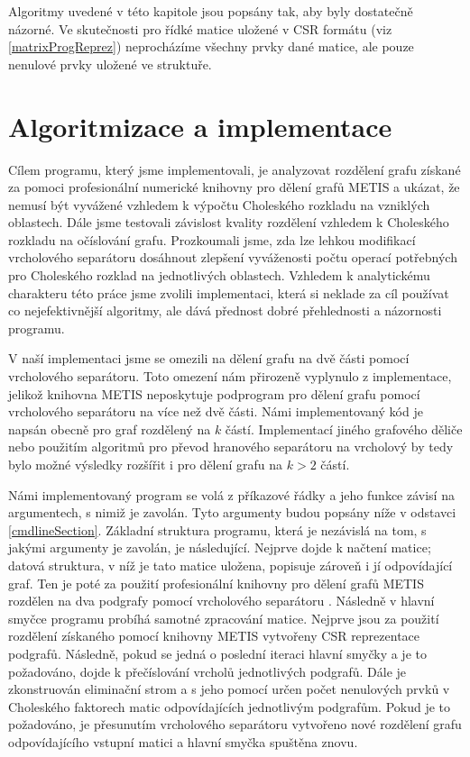 \documentclass{ctuthesis}
\theoremstyle{plain}
\theoremstyle{definition}
\begin{document}
Algoritmy uvedené v této kapitole jsou popsány tak, aby byly dostatečně názorné. Ve skutečnosti pro řídké matice uložené v CSR formátu (viz \ref{matrixProgReprez}) neprocházíme všechny prvky dané matice, ale pouze nenulové prvky uložené ve struktuře.


\chapter{Algoritmizace a implementace}

Cílem programu, který jsme implementovali, je analyzovat rozdělení grafu získané za pomoci profesionální numerické knihovny pro dělení grafů METIS a ukázat, že nemusí být vyvážené vzhledem k výpočtu Choleského rozkladu na vzniklých oblastech. Dále jsme testovali závislost kvality rozdělení vzhledem k Choleského rozkladu na očíslování grafu. Prozkoumali jsme, zda lze lehkou modifikací vrcholového separátoru dosáhnout zlepšení vyváženosti počtu operací potřebných pro Choleského rozklad na jednotlivých oblastech. Vzhledem k analytickému charakteru této práce jsme zvolili implementaci, která si neklade za cíl používat co nejefektivnější algoritmy, ale dává přednost dobré přehlednosti a názornosti programu.

V naší implementaci jsme se omezili na dělení grafu na dvě části pomocí vrcholového separátoru. Toto omezení nám přirozeně vyplynulo z implementace, jelikož knihovna METIS neposkytuje podprogram pro dělení grafu pomocí vrcholového separátoru na více než dvě části. Námi implementovaný kód je napsán obecně pro graf rozdělený na $k$ částí. Implementací jiného grafového děliče nebo použitím algoritmů pro převod hranového separátoru na vrcholový by tedy bylo možné výsledky rozšířit i pro dělení grafu na $k>2$ částí.

Námi implementovaný program se volá z příkazové řádky a jeho funkce závisí na argumentech, s nimiž je zavolán. Tyto argumenty budou popsány níže v odstavci \ref{cmdlineSection}. Základní struktura programu, která je nezávislá na tom, s jakými argumenty je zavolán, je následující. Nejprve dojde k načtení matice; datová struktura, v níž je tato matice uložena, popisuje zároveň i jí odpovídající graf. Ten je poté za použití profesionální knihovny pro dělení grafů METIS rozdělen na dva podgrafy pomocí vrcholového separátoru . Následně v hlavní smyčce programu probíhá samotné zpracování matice. Nejprve jsou za použití rozdělení získaného pomocí knihovny METIS vytvořeny CSR reprezentace podgrafů. Následně, pokud se jedná o poslední iteraci hlavní smyčky a je to požadováno, dojde k přečíslování vrcholů jednotlivých podgrafů. Dále je zkonstruován eliminační strom a s jeho pomocí určen počet nenulových prvků v Choleského faktorech matic odpovídajících jednotlivým podgrafům. Pokud je to požadováno, je přesunutím vrcholového separátoru vytvořeno nové rozdělení grafu odpovídajícího vstupní matici a hlavní smyčka spuštěna znovu. 
\end{document}
